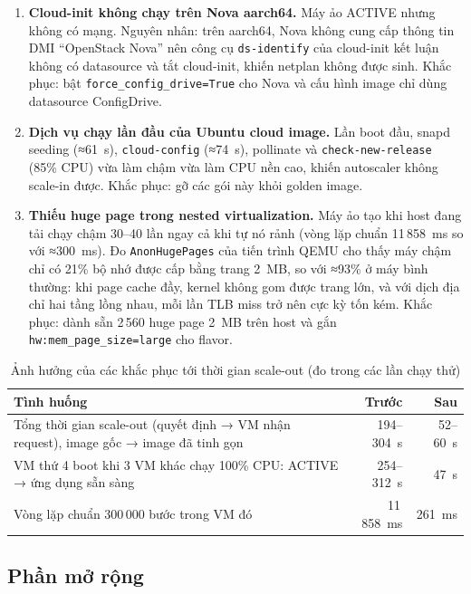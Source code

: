 \documentclass[runningheads]{llncs}
\newcommand{\code}[1]{\texttt{#1}}
\begin{document}
\begin{enumerate}
\item \textbf{Cloud-init không chạy trên Nova aarch64.} Máy ảo ACTIVE nhưng không có mạng. Nguyên nhân: trên aarch64, Nova không cung cấp thông tin DMI ``OpenStack Nova'' nên công cụ \code{ds-identify} của cloud-init kết luận không có datasource và tắt cloud-init, khiến netplan không được sinh. Khắc phục: bật \code{force\_config\_drive=True} cho Nova và cấu hình image chỉ dùng datasource ConfigDrive.
\item \textbf{Dịch vụ chạy lần đầu của Ubuntu cloud image.} Lần boot đầu, snapd seeding (≈61~s), \code{cloud-config} (≈74~s), pollinate và \code{check-new-release} (85\% CPU) vừa làm chậm vừa làm CPU nền cao, khiến autoscaler không scale-in được. Khắc phục: gỡ các gói này khỏi golden image.
\item \textbf{Thiếu huge page trong nested virtualization.} Máy ảo tạo khi host đang tải chạy chậm 30–40 lần ngay cả khi tự nó rảnh (vòng lặp chuẩn 11\,858~ms so với ≈300~ms). Đo \code{AnonHugePages} của tiến trình QEMU cho thấy máy chậm chỉ có 21\% bộ nhớ được cấp bằng trang 2~MB, so với ≈93\% ở máy bình thường: khi page cache đầy, kernel không gom được trang lớn, và với dịch địa chỉ hai tầng lồng nhau, mỗi lần TLB miss trở nên cực kỳ tốn kém. Khắc phục: dành sẵn 2\,560 huge page 2~MB trên host và gắn \code{hw:mem\_page\_size=large} cho flavor.
\end{enumerate}

\begin{table}[!tbp]
\caption{Ảnh hưởng của các khắc phục tới thời gian scale-out (đo trong các lần chạy thử)}\label{tab:fix}
\centering\small
\begin{tabularx}{\textwidth}{@{}Lrr@{}}
\toprule
Tình huống & Trước & Sau \\
\midrule
Tổng thời gian scale-out (quyết định → VM nhận request), image gốc → image đã tinh gọn & 194–304~s & 52–60~s \\
VM thứ 4 boot khi 3 VM khác chạy 100\% CPU: ACTIVE → ứng dụng sẵn sàng & 254–312~s & 47~s \\
Vòng lặp chuẩn 300\,000 bước trong VM đó & 11\,858~ms & 261~ms \\
\bottomrule
\end{tabularx}
\end{table}

\subsection{Phần mở rộng}
\end{document}

